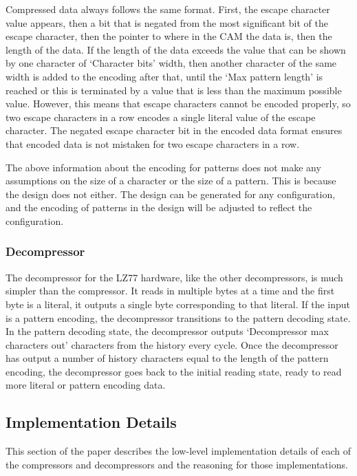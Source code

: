 \documentclass[doublespace,nopageskip]{VTthesis}
\begin{document}
Compressed data always follows the same format. First, the escape character value appears, then a bit that is negated from the most significant bit of the escape character, then the pointer to where in the CAM the data is, then the length of the data. If the length of the data exceeds the value that can be shown by one character of `Character bits' width, then another character of the same width is added to the encoding after that, until the `Max pattern length' is reached or this is terminated by a value that is less than the maximum possible value. However, this means that escape characters cannot be encoded properly, so two escape characters in a row encodes a single literal value of the escape character. The negated escape character bit in the encoded data format ensures that encoded data is not mistaken for two escape characters in a row.

The above information about the encoding for patterns does not make any assumptions on the size of a character or the size of a pattern. This is because the design does not either. The design can be generated for any configuration, and the encoding of patterns in the design will be adjusted to reflect the configuration.

\subsubsection{Decompressor}\label{sss:lz77_decompressor_design}
The decompressor for the LZ77 hardware, like the other decompressors, is much simpler than the compressor. It reads in multiple bytes at a time and the first byte is a literal, it outputs a single byte corresponding to that literal. If the input is a pattern encoding, the decompressor transitions to the pattern decoding state. In the pattern decoding state, the decompressor outputs `Decompressor max characters out' characters from the history every cycle. Once the decompressor has output a number of history characters equal to the length of the pattern encoding, the decompressor goes back to the initial reading state, ready to read more literal or pattern encoding data.

\subsection{Implementation Details}\label{se:lz77_implementation_details}
This section of the paper describes the low-level implementation details of each of the compressors and decompressors and the reasoning for those implementations.
\end{document}
